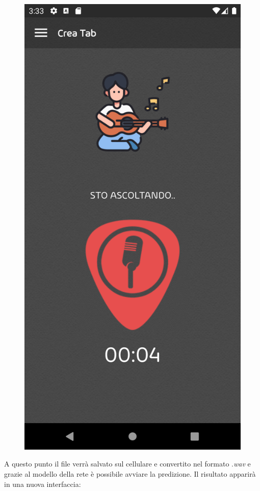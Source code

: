\begin{figure}[H]
	\includegraphics[scale=0.10]{./images/img22.png}
\end{figure}
\noindent A questo punto il file verrà salvato sul cellulare e convertito nel formato .\textit{wav} e grazie al modello della rete è possibile avviare la predizione. Il risultato apparirà in una nuova interfaccia:
